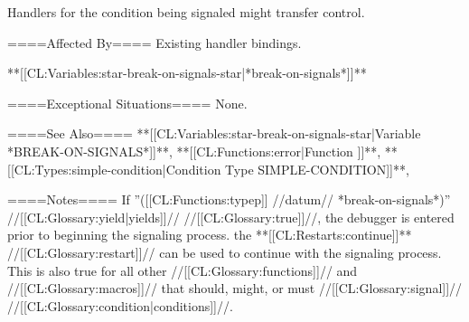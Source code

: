 Handlers for the condition being signaled might transfer control.

====Affected By====
Existing handler bindings.

**[[CL:Variables:star-break-on-signals-star|*break-on-signals*]]**

====Exceptional Situations====
None.

====See Also====
**[[CL:Variables:star-break-on-signals-star|Variable *BREAK-ON-SIGNALS*]]**, **[[CL:Functions:error|Function ]]**, **[[CL:Types:simple-condition|Condition Type SIMPLE-CONDITION]]**,{\secref\CondSignalHandle}

====Notes====
If ''([[CL:Functions:typep]] //datum// *break-on-signals*)'' //[[CL:Glossary:yield|yields]]// //[[CL:Glossary:true]]//, the debugger is entered prior to beginning the signaling process. the **[[CL:Restarts:continue]]** //[[CL:Glossary:restart]]// can be used to continue with the signaling process. This is also true for all other //[[CL:Glossary:functions]]// and //[[CL:Glossary:macros]]// that should, might, or must //[[CL:Glossary:signal]]// //[[CL:Glossary:condition|conditions]]//.

